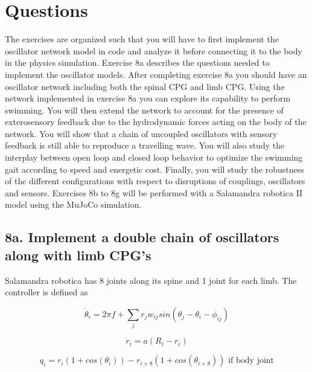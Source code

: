 \documentclass{cmc}
\begin{document}
\newpage

\section*{Questions}

The exercises are organized such that you will have to first implement the
oscillator network model in  code and analyze it before
connecting it to the body in the physics simulation.  Exercise 8a describes the
questions needed to implement the oscillator models. After completing exercise
8a you should have an oscillator network including both the spinal CPG and limb
CPG. Using the network implemented in exercise 8a you can explore its
capability to perform swimming. You will then extend the network to account
for the presence of exterosensory feedback due to the hydrodynamic forces
acting on the body of the network. You will show that a chain of uncoupled
oscillators with sensory feedback is still able to reproduce a travelling wave.
You will also study the interplay between open loop and closed loop
behavior to optimize the swimming gait according to speed and energetic cost.
Finally, you will study the robustness of the different configurations with
respect to disruptions of couplings, oscillators and sensors.
Exercises 8b to 8g will be performed with a Salamandra robotica II model using
the MuJoCo simulation.


\subsection*{8a. Implement a double chain of oscillators along with
  limb CPG's}
\label{sec:implement-chain}

Salamandra robotica has 8 joints along its spine and 1 joint for each
limb. The controller is defined as

\begin{equation}
  \label{eq:dphase}
  \dot{\theta}_i = 2 \pi f + \sum_j r_j w_{ij} sin(\theta_j - \theta_i - \phi_{ij})
\end{equation}

\begin{equation}
  \label{eq:dr}
  \dot{r}_i = a (R_i - r_i)
\end{equation}

\begin{equation}
  \label{eq:output}
  q_i = r_i(1 + cos(\theta_i)) - r_{i+8}(1 + cos(\theta_{i+8})) \text{ if body joint}
\end{equation}
\end{document}
